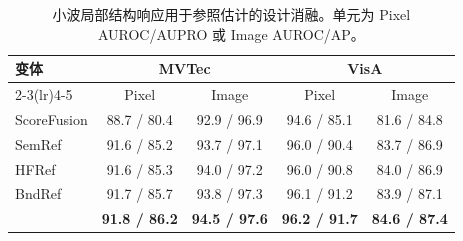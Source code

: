 \begin{table}[t]
\centering
\caption{小波局部结构响应用于参照估计的设计消融。单元为 Pixel AUROC/AUPRO 或 Image AUROC/AP。}
\label{tab:wavelet-design-ablation}
\small
\setlength{\tabcolsep}{5pt}
\begin{tabular}{@{}lcccc@{}}
\toprule
\multirow{2}{*}{变体} & \multicolumn{2}{c}{MVTec} & \multicolumn{2}{c}{VisA} \\
\cmidrule(lr){2-3}\cmidrule(lr){4-5}
& Pixel & Image & Pixel & Image \\
\midrule
ScoreFusion & 88.7 / 80.4 & 92.9 / 96.9 & 94.6 / 85.1 & 81.6 / 84.8 \\
SemRef & 91.6 / 85.2 & 93.7 / 97.1 & 96.0 / 90.4 & 83.7 / 86.9 \\
HFRef & 91.6 / 85.3 & 94.0 / 97.2 & 96.0 / 90.8 & 84.0 / 86.9 \\
BndRef & 91.7 / 85.7 & 93.8 / 97.3 & 96.1 / 91.2 & 83.9 / 87.1 \\
\method{} & \textbf{91.8 / 86.2} & \textbf{94.5 / 97.6} & \textbf{96.2 / 91.7} & \textbf{84.6 / 87.4} \\
\bottomrule
\end{tabular}
\end{table}
